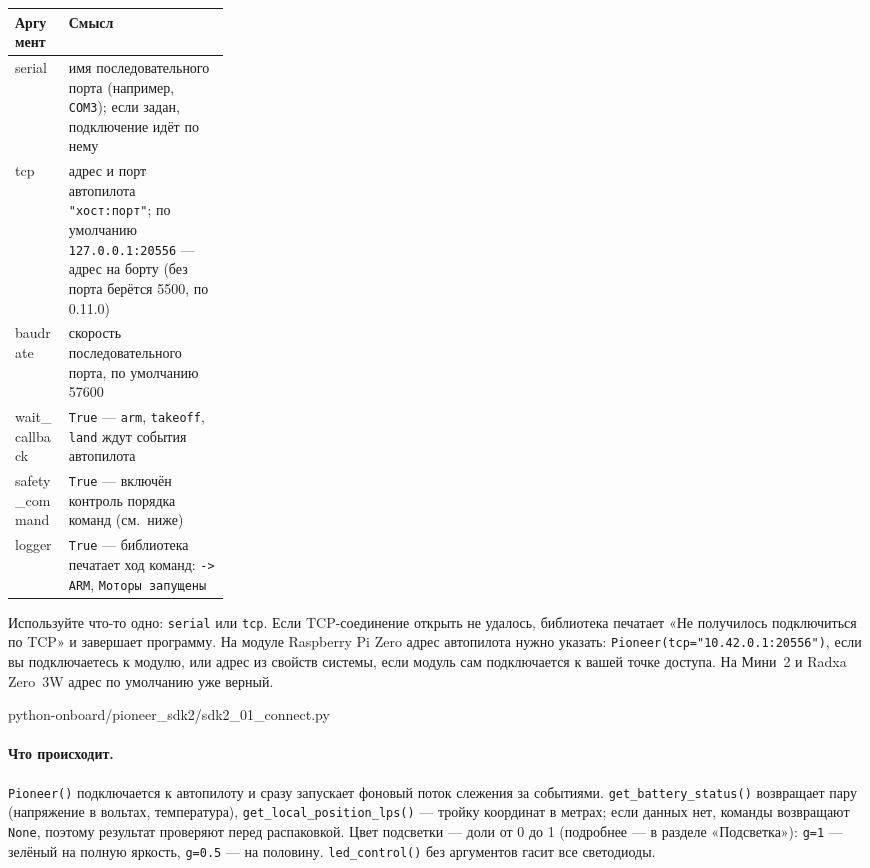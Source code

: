\begin{center}
\small
\begin{tabularx}{\linewidth}{@{}>{\ttfamily\raggedright\arraybackslash}p{0.25\linewidth} X@{}}
\toprule
\textrm{\textbf{Аргумент}} & \textbf{Смысл} \\
\midrule
serial & имя последовательного порта (например, \verb|COM3|); если задан, подключение идёт по нему \\
tcp & адрес и порт автопилота \verb|"хост:порт"|; по умолчанию \verb|127.0.0.1:20556| --- адрес на борту (без порта берётся 5500, по 0.11.0) \\
baudrate & скорость последовательного порта, по умолчанию 57600 \\
wait\_callback & \verb|True| --- \verb|arm|, \verb|takeoff|, \verb|land| ждут события автопилота \\
safety\_command & \verb|True| --- включён контроль порядка команд (см.\ ниже) \\
logger & \verb|True| --- библиотека печатает ход команд: \texttt{-> ARM}, \texttt{Моторы запущены} \\
\bottomrule
\end{tabularx}
\end{center}

Используйте что-то одно: \verb|serial| или \verb|tcp|. Если TCP-соединение открыть не удалось, библиотека печатает «Не получилось подключиться по TCP» и завершает программу. На модуле Raspberry Pi Zero адрес автопилота нужно указать: \verb|Pioneer(tcp="10.42.0.1:20556")|, если вы подключаетесь к модулю, или адрес из свойств системы, если модуль сам подключается к вашей точке доступа. На Мини~2 и Radxa Zero~3W адрес по умолчанию уже верный.

\begin{codefile}[python]{python-onboard/pioneer_sdk2/sdk2_01_connect.py}
\end{codefile}

\paragraph{Что происходит.} \verb|Pioneer()| подключается к автопилоту и сразу запускает фоновый поток слежения за событиями. \verb|get_battery_status()| возвращает пару (напряжение в вольтах, температура), \verb|get_local_position_lps()| --- тройку координат в метрах; если данных нет, команды возвращают \verb|None|, поэтому результат проверяют перед распаковкой. Цвет подсветки --- доли от 0 до 1 (подробнее --- в разделе «Подсветка»): \verb|g=1| --- зелёный на полную яркость, \verb|g=0.5| --- на половину. \verb|led_control()| без аргументов гасит все светодиоды.

